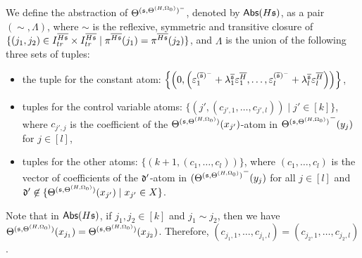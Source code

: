 We define the abstraction of $\Theta^{({\mathfrak{s} },\Theta^{(H,\Omega_0)})^-}$, denoted by $\mathsf{Abs}(H{\mathfrak{s} })$, as a pair $(\sim, \Lambda)$, where $\sim $ is the reflexive, symmetric and transitive closure of $\{(j_1, j_2) \in I^{\overline{H{\mathfrak{s} }}}_{tr} \times I^{\overline{H{\mathfrak{s} }}}_{tr} \mid \pi^{\overline{H{\mathfrak{s} }}}(j_1)= \pi^{\overline{H{\mathfrak{s} }}}(j_2)\}$, and $\Lambda$ is the union of the following three sets of tuples:
\begin{itemize}
\item the tuple for the constant atom: $\left\{\left(0, \left( \varepsilon^{(\overline{{\mathfrak{s} }})^-}_{1}+ \lambda^{\overline{{\mathfrak{s} }}}_{1} \varepsilon^{\overline{H}}_{1},\dots, \varepsilon^{(\overline{{\mathfrak{s} }})^-}_{l}+ \lambda^{\overline{{\mathfrak{s} }}}_{l} \varepsilon^{\overline{H}}_{l} \right) \right)\right\}$,
% 
\item tuples for the control variable atoms: $\{(j', (c_{j',1},\dots, c_{j', l})) \mid j' \in [k]\}$, where $c_{j', j}$ is the coefficient of the ${\Theta^{({\mathfrak{s} },\Theta^{(H,\Omega_0)})}}(x_{j'})$-atom in ${\Theta^{({\mathfrak{s} },\Theta^{(H,\Omega_0)})}}^-(y_{j})$ for $j\in[l]$,
% 
\item tuples for the other atoms: $\{(k+1, (c_1,\dots,c_l))\}$, where $(c_1,\dots,c_l)$ is the vector of coefficients of the $\mathfrak{d}'$-atom in ${(\Theta^{({\mathfrak{s} },\Theta^{(H,\Omega_0)})}}^-(y_{j})$ for all $j \in [l]$ and $\mathfrak{d}'\not\in \{{\Theta^{({\mathfrak{s} },\Theta^{(H,\Omega_0)})}}(x_{j'})\mid x_{j'}\in X\}$.
\end{itemize}
Note that in $\mathsf{Abs}(H{\mathfrak{s} })$, if $j_1, j_2 \in [k]$ and $j_1 \sim j_2$, then we have $\Theta^{({\mathfrak{s} },\Theta^{(H,\Omega_0)})}(x_{j_1})=\Theta^{({\mathfrak{s} },\Theta^{(H,\Omega_0)})}(x_{j_2})$. Therefore, $(c_{j_1, 1}, \dots, c_{j_1, l}) = (c_{j_2,1}, \dots, c_{j_2, l})$.

